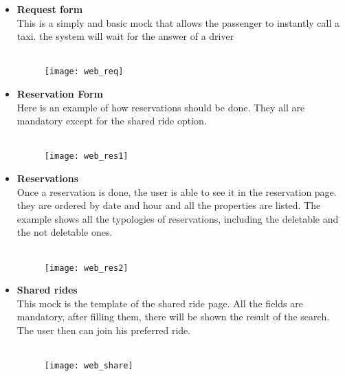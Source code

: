 \begin{itemize}
\item \textbf{Request form} \\ This is a simply and basic mock that allows the passenger to instantly call a taxi. the system will wait for the answer of a driver \\ \\
\begin{figure}[h]
	\centering	
	\texttt{[image: web\_req]}
\end{figure}
\newpage

\item \textbf{Reservation Form} \\ Here is an example of how reservations should be done. They all are mandatory except for the shared ride option. \\ \\
\begin{figure}[h]
	\centering	
	\texttt{[image: web\_res1]}
\end{figure}
\newpage

\item \textbf{Reservations} \\ Once a reservation is done, the user is able to see it in the reservation page. they are ordered by date and hour and all the properties are listed. The example shows all the typologies of reservations, including the deletable and the not deletable ones. \\ \\
\begin{figure}[h]
	\centering	
	\texttt{[image: web\_res2]}
\end{figure}
\newpage

\item \textbf{Shared rides} \\ This mock is the template of the shared ride page. All the fields are mandatory, after filling them, there will be shown the result of the search. The user then can join his preferred ride. \\ \\
\begin{figure}[h]
	\centering	
	\texttt{[image: web\_share]}
\end{figure}
\newpage
	
	
\end{itemize}












